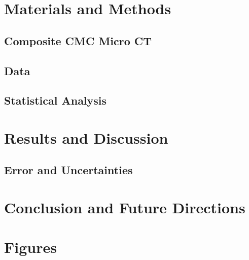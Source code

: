 \documentclass[12pt]{article}
\begin{document}
\section{Materials and Methods}

\subsection{Composite CMC Micro CT } 

\subsection{Data}

\subsection{Statistical Analysis} 


\section{Results and Discussion} 

\subsection{Error and Uncertainties} 

\section{Conclusion and Future Directions} 

\section{Figures}





%
%
\end{document}
